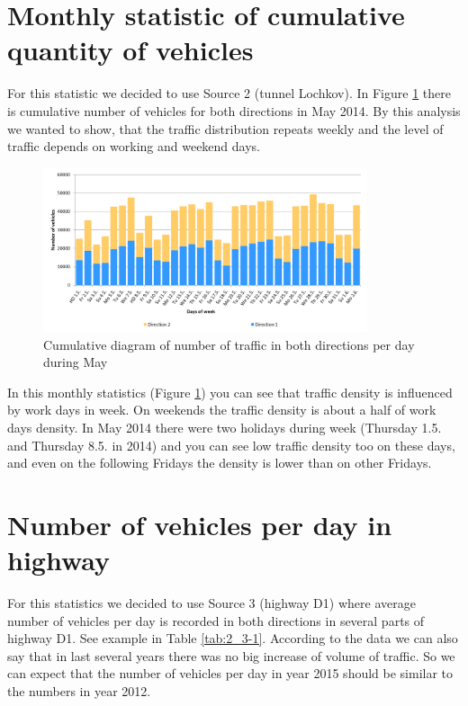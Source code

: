 \section{Monthly statistic of cumulative quantity of vehicles}

For this statistic we decided to use Source 2 (tunnel Lochkov). In Figure \ref{fig:2_2-1} there is cumulative number of vehicles for both directions in May 2014. By this analysis we wanted to show, that the traffic distribution repeats  weekly and the level of traffic depends on working and weekend days.

\begin{figure}[ph]
\includegraphics[width=0.85\textwidth,height=0.90\textheight,keepaspectratio]{figures/Chapter_2/2_Cum_diag_month.png}
\centering
\protect\caption{\label{fig:2_2-1}Cumulative diagram of number of traffic in both directions per day during May}
\end{figure}

In this monthly statistics (Figure \ref{fig:2_2-1}) you can see that traffic density is influenced by work days in week. On weekends the traffic density is about a half of work days density. In May 2014 there were two holidays during week (Thursday 1.5. and Thursday 8.5. in 2014) and you can see low traffic density too on these days, and even on the following Fridays the density is lower than on other Fridays.





  
  
  
  


\section{Number of vehicles per day in highway}

For this statistics we decided to use Source 3 (highway D1) where average number of vehicles per day is recorded in both directions in several parts of highway D1. See example in Table \ref{tab:2_3-1}. According to the data we can also say that in last several years there was no big increase of volume of traffic. So we can expect that the number of vehicles per day in year 2015 should be similar to the numbers in year 2012.

